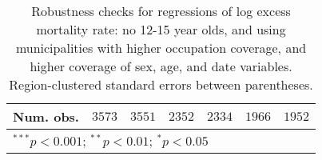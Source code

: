 \begin{table}[h!]
\begin{center}
\begin{small}
\begin{tabular}{l c c c c c c}
Num. obs.      & $3573$        & $3551$        & $2352$        & $2334$        & $1966$        & $1952$        \\
\hline
\multicolumn{7}{l}{\tiny{$^{***}p<0.001$; $^{**}p<0.01$; $^{*}p<0.05$}}
\end{tabular}
\end{small}
\caption{Robustness checks for regressions of log excess mortality rate: no 12-15 year olds, and using municipalities with higher occupation coverage, and higher coverage of sex, age, and date variables. Region-clustered standard errors between parentheses.}
\label{tab:cutoffmodels}
\end{center}
\end{table}

